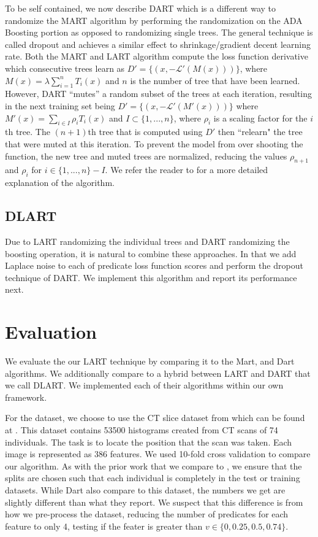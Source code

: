 \documentclass{article} %
\begin{document}
To be self contained, we now describe DART\cite{dart} which is a different way to randomize the MART algorithm by performing the randomization on the ADA Boosting portion as opposed to randomizing single trees. The general technique is called dropout and achieves a similar effect to shrinkage/gradient decent learning rate. Both the MART and LART algorithm compute the loss function derivative  which consecutive trees learn as $D'=\{(x,-\mathcal{L}'(M(x)))\}$, where $M(x) =\lambda \sum_{i=1}^n T_i(x)$ and $n$ is the number of tree that have been learned. However, DART ``mutes'' a random subset of the trees at each iteration, resulting in the next training set being $D'=\{(x,-\mathcal{L}'(M'(x)))\}$ where $M'(x) = \sum_{i\in I} \rho_i {T_i(x)} $ and $I\subset \{1,...,n\}$, where $\rho_i$ is a scaling factor for the $i$th tree. The  $(n+1)$th tree that is computed using $D'$ then ``relearn" the tree that were muted at this iteration. To prevent the model from over shooting the function, the new tree and muted trees are normalized, reducing the values $\rho_{n+1}$ and $\rho_i$ for $i\in \{1,...,n\}-I$. We refer the reader to \cite{dart} for a more detailed explanation of the algorithm.

\subsection{DLART}

Due to LART randomizing the individual trees and DART randomizing the boosting operation, it is natural to combine these approaches. In that we add Laplace noise to each of predicate loss function scores and perform the dropout technique of DART. We implement this algorithm and report its performance next.

\section{Evaluation}

We evaluate the our LART technique by comparing it to the Mart, and Dart\cite{dart} algorithms. We additionally compare to a hybrid between LART and DART that we call DLART. We implemented each of their algorithms within our own framework. 

For the dataset, we choose to use the CT slice dataset from \cite{graf20112d} which can be found at \cite{uci_ctSlice}. This dataset contains 53500 histograms created from CT scans of 74 individuals. The task is to locate the position that the scan was taken. Each image is represented as 386 features. We used 10-fold cross validation to compare our algorithm. As with the prior work that we compare to \cite{dart}, we ensure that the splits are chosen such that each individual is completely in the test or training datasets. While Dart\cite{dart} also compare to this dataset, the numbers we get are slightly different than what they report. We suspect that this difference is from how we pre-process the dataset, reducing the number of predicates for each feature to only 4, testing if the feater is greater than $v\in\{0,0.25,0.5,0.74\}$.
\end{document}
